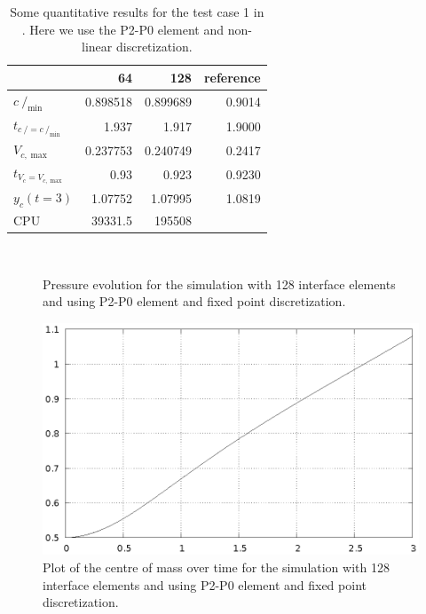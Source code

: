 \documentclass[a4paper,12pt,onecolumn]{article}
\newcommand{\strikec}{\mbox{$c\!\!\!\!\:/$}}
\begin{document}
\begin{table}
\center
\begin{tabular}{lrrr}
\hline
& 64 & 128 & reference \\
\hline
$\strikec_{\min}$ & 0.898518 & 0.899689 & 0.9014 \\
$t_{\strikec = \strikec_{\min}}$ & 1.937 & 1.917 & 1.9000 \\
$V_{c,\max}$ & 0.237753 & 0.240749 & 0.2417 \\
$t_{V_c = V_{c,\max}}$ & 0.93 & 0.923 & 0.9230 \\
$y_c(t=3)$ & 1.07752 & 1.07995 & 1.0819 \\
CPU & 39331.5 & 195508 & \\
\hline
\end{tabular}
\caption{Some quantitative results for the test case 1 in
\cite{HysingTKPBGT09}. Here we use the P2-P0 element and non-linear
discretization.}
\label{tab:2d_benchmark1_P0_nonlinear}
\end{table}

\begin{figure}[htbp]
\centering
{}
 \\
\caption{Pressure evolution for the simulation with 128 interface elements and
using P2-P0 element and fixed point discretization.}
\label{fig:2d_benchmark1_pressure}
\end{figure}
\begin{figure}[htbp]
\centering
\includegraphics[width=.45\textwidth]
{figures/2d_benchmark1_barycenter_p0_nonlinear_128.ps}
\caption{Plot of the centre of mass over time for the simulation with 128
interface elements and using P2-P0 element and fixed point discretization.}
\label{fig:2d_benchmark1_barycenter}
\end{figure}
\end{document}
